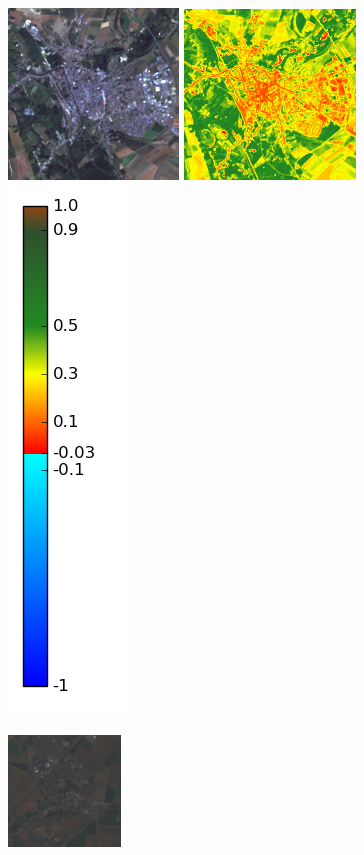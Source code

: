 \documentclass{book}
\begin{document}
\begin{figure}[H]
\centerline{
\includegraphics[scale=0.9]{images/Abbeville/07_rgb.png}
\includegraphics[scale=0.9]{images/Abbeville/07_ndvi.png}
\includegraphics[scale=0.3]{images/colormap.png}
}
\centerline{
\includegraphics[scale=0.9]{images/Louvres/07_rgb.png}
}
\end{figure}
\end{document}

